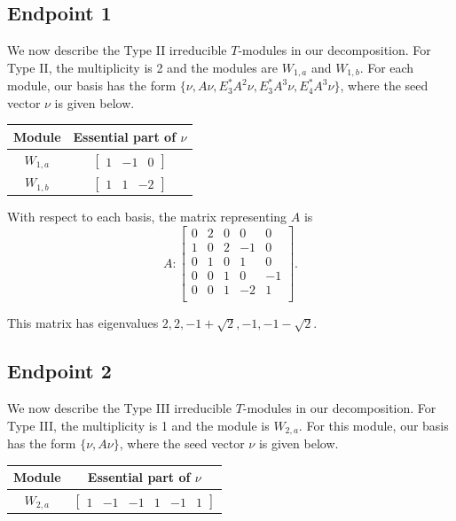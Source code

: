 \documentclass[12pt,letterpaper]{article}
\newcommand{\rowvector}[1]{\begin{bmatrix} #1 \end{bmatrix}}
\begin{document}
\subsection{Endpoint 1}

We now describe the Type II irreducible $T$-modules in our decomposition. For Type II, the multiplicity is 2 and the modules are $W_{1,a}$ and $W_{1,b}$. For each module, our basis has the form $\{\nu, A\nu, E_3^*A^2\nu, E_3^*A^3\nu, E_4^*A^3\nu\}$, where the seed vector $\nu$ is given below.
\begin{center}
    \begin{tabular}{c | c}
    \toprule
       \textbf{Module}  & \textbf {Essential part of }$\nu$ \\
       \midrule
       $W_{1,a}$  & $\rowvector{1 & -1 & 0}$ \\[1.67pt]
       $W_{1,b}$  & $\rowvector{1 & 1 & -2}$ \\
    \bottomrule
    \end{tabular}
\end{center}

With respect to each basis, the matrix representing $A$ is 
\begin{equation}
    A: \begin{bmatrix}
  0 & 2 & 0 & 0 & 0 \\
  1 & 0 & 2 & -1 & 0 \\
  0 & 1 & 0 & 1 & 0 \\
  0 & 0 & 1 & 0 & -1 \\
  0 & 0 & 1 & -2 & 1 \\
\end{bmatrix}.
\label{eq:cox-II}
\end{equation}

This matrix has eigenvalues $2,2, -1+\sqrt{2}, -1, -1-\sqrt{2}$.

\subsection{Endpoint 2}

We now describe the Type III irreducible $T$-modules in our decomposition. For Type III, the multiplicity is 1 and the module is  $W_{2,a}$. For this module, our basis has the form $\{\nu, A\nu\}$, where the seed vector $\nu$ is given below.
\begin{center}
    \begin{tabular}{c | c}
    \toprule
       \textbf{Module}  & \textbf {Essential part of }$\nu$ \\
       \midrule
       $W_{2,a}$  & $\rowvector{1 & -1 & -1 & 1 & -1 & 1}$ \\
    \bottomrule
    \end{tabular}
\end{center}
\end{document}
